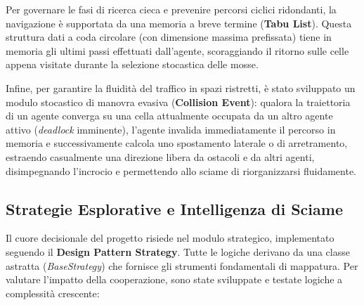 \documentclass[11pt,a4paper]{article}
\begin{document}
Per governare le fasi di ricerca cieca e prevenire percorsi ciclici ridondanti, la navigazione è supportata da una memoria a breve termine (\textbf{Tabu List}). Questa struttura dati a coda circolare (con dimensione massima prefissata) tiene in memoria gli ultimi passi effettuati dall'agente, scoraggiando il ritorno sulle celle appena visitate durante la selezione stocastica delle mosse.

Infine, per garantire la fluidità del traffico in spazi ristretti, è stato sviluppato un modulo stocastico di manovra evasiva (\textbf{Collision Event}): qualora la traiettoria di un agente converga su una cella attualmente occupata da un altro agente attivo (\textit{deadlock} imminente), l'agente invalida immediatamente il percorso in memoria e successivamente calcola uno spostamento laterale o di arretramento, estraendo casualmente una direzione libera da ostacoli e da altri agenti, disimpegnando l'incrocio e permettendo allo sciame di riorganizzarsi fluidamente.

\subsection{Strategie Esplorative e Intelligenza di Sciame}
Il cuore decisionale del progetto risiede nel modulo strategico, implementato seguendo il \textbf{Design Pattern Strategy}. Tutte le logiche derivano da una classe astratta (\textit{BaseStrategy}) che fornisce gli strumenti fondamentali di mappatura. Per valutare l'impatto della cooperazione, sono state sviluppate e testate logiche a complessità crescente:
\end{document}
